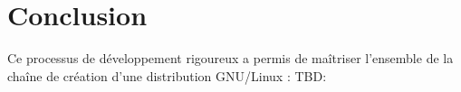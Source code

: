 
\clearpage
                                            
                                            

\clearpage





\section{Conclusion}
Ce processus de développement rigoureux a permis de maîtriser l'ensemble de la chaîne de création d'une distribution GNU/Linux :
TBD:
 



